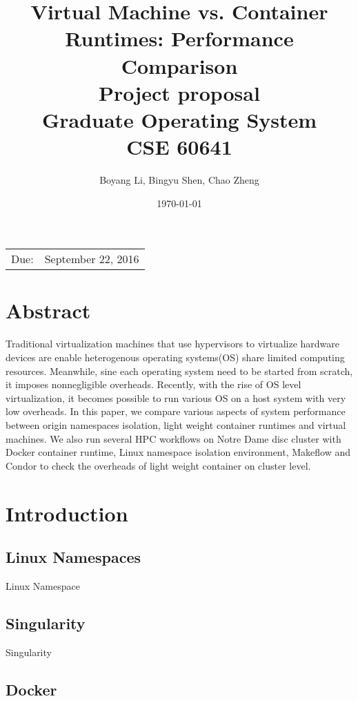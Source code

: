 \documentclass{article}
\title{{\textbf{Virtual Machine vs. Container Runtimes: Performance Comparison}} \\
       \vspace{3\baselineskip}
       {\large Project proposal} \\
       \vspace{3\baselineskip}
       {\large Graduate Operating System} \\ 
       {\large CSE 60641} %
      }
\date{\today} %
\author{Boyang Li, Bingyu Shen, Chao Zheng}
\begin{document}
\maketitle %

\begin{center}
\begin{tabular}{l r}
Due:& September 22, 2016\\ 
\end{tabular}
\end{center}
\nocite{*}

\pagebreak

\section{Abstract}

Traditional virtualization machines that use hypervisors to virtualize hardware devices are 
enable heterogenous operating systems(OS) share limited computing resources. Meanwhile, sine each 
operating system need to be started from scratch, it imposes nonnegligible overheads. Recently, 
with the rise of OS level virtualization, it becomes possible to run various OS on a host system 
with very low overheads. In this paper, we compare various aspects of system performance between 
origin namespaces isolation, light weight container runtimes and virtual machines. We also run several
HPC workflows on Notre Dame disc cluster with Docker container runtime\cite{dockerwb}, Linux namespace
isolation environment, Makeflow\cite{albrecht2012makeflow} and Condor\cite{thain2003condor} to 
check the overheads of light weight container on cluster level.  

\section{Introduction}

\subsection{Linux Namespaces}

Linux Namespace\cite{rosen2013resource}

\subsection{Singularity}

Singularity\cite{singularity}

\subsection{Docker}
\end{document}
